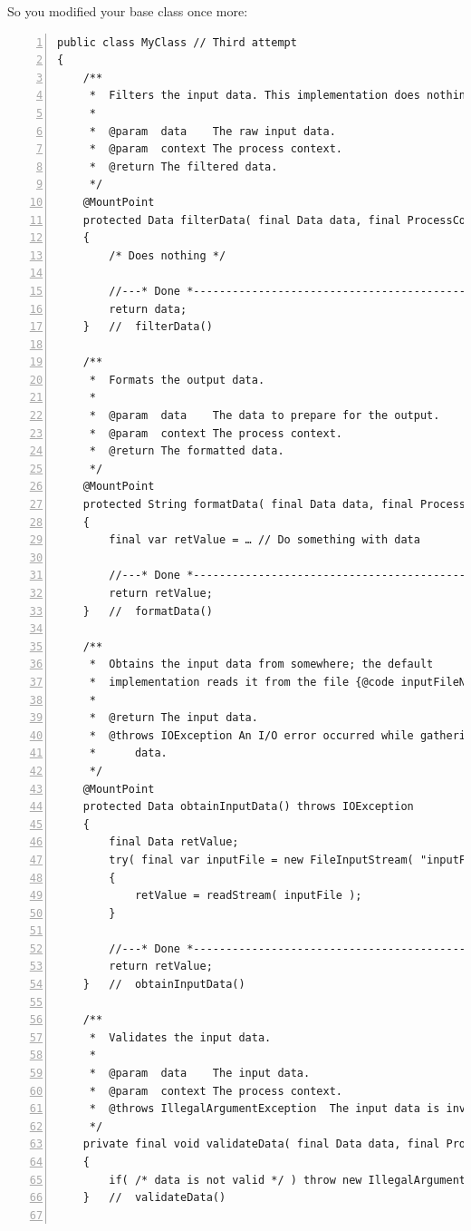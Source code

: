 \documentclass[11pt,a4paper, titlepage, parskip=half, headsepline, footsepline, cleardoublepage=current, headheight=1cm]{scrbook}
\begin{document}
So you modified your base class once more:
\begin{lstlisting}[numbers=left]
public class MyClass // Third attempt
{
    /**
     *  Filters the input data. This implementation does nothing.
     *  
     *  @param  data    The raw input data.
     *  @param  context The process context.
     *  @return	The filtered data.
     */
    @MountPoint 
    protected Data filterData( final Data data, final ProcessContext context )
    {
        /* Does nothing */
        
        //---* Done *------------------------------------------------
        return data;
    }   //  filterData()
    
    /**
     *  Formats the output data.
     * 
     *  @param  data    The data to prepare for the output.
     *  @param  context The process context.
     *  @return	The formatted data.
     */
    @MountPoint
    protected String formatData( final Data data, final ProcessContext context )
    {
        final var retValue = … // Do something with data
        
        //---* Done *------------------------------------------------
        return retValue;
    }   //  formatData()
    
    /**
     *  Obtains the input data from somewhere; the default 
     *  implementation reads it from the file {@code inputFileName}.
     *
     *  @return The input data.
     *  @throws IOException An I/O error occurred while gathering the 
     *      data.
     */
    @MountPoint
    protected Data obtainInputData() throws IOException
    {
        final Data retValue;
        try( final var inputFile = new FileInputStream( "inputFileName" ) )
        {
            retValue = readStream( inputFile );
        }
        
        //---* Done *------------------------------------------------
        return retValue;
    }   //  obtainInputData()
        
    /**
     *  Validates the input data.
     *  
     *  @param  data    The input data.
     *  @param  context The process context.
     *  @throws IllegalArgumentException  The input data is invalid.
     */
    private final void validateData( final Data data, final ProcessContext context )
    {
        if( /* data is not valid */ ) throw new IllegalArgumentException();
    }   //  validateData()
    

\end{lstlisting}
\end{document}
